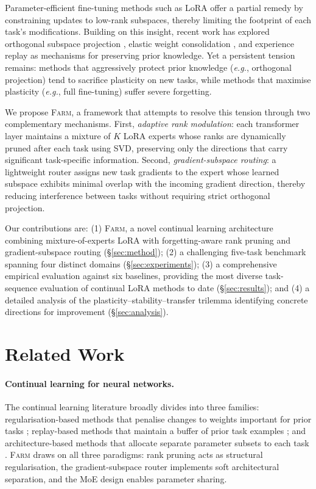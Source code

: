 \documentclass{article}
\newcommand{\FARM}{\textsc{Farm}}
\newcommand{\eg}{\textit{e.g.}}
\begin{document}
Parameter-efficient fine-tuning methods such as LoRA \citep{hu2022lora} offer a partial remedy by constraining updates to low-rank subspaces, thereby limiting the footprint of each task's modifications. Building on this insight, recent work has explored orthogonal subspace projection \citep{wang2023orthogonal}, elastic weight consolidation \citep{kirkpatrick2017overcoming}, and experience replay \citep{rolnick2019experience} as mechanisms for preserving prior knowledge. Yet a persistent tension remains: methods that aggressively protect prior knowledge (\eg, orthogonal projection) tend to sacrifice plasticity on new tasks, while methods that maximise plasticity (\eg, full fine-tuning) suffer severe forgetting.

We propose \FARM{}, a framework that attempts to resolve this tension through two complementary mechanisms. First, \emph{adaptive rank modulation}: each transformer layer maintains a mixture of $K$ LoRA experts whose ranks are dynamically pruned after each task using SVD, preserving only the directions that carry significant task-specific information. Second, \emph{gradient-subspace routing}: a lightweight router assigns new task gradients to the expert whose learned subspace exhibits minimal overlap with the incoming gradient direction, thereby reducing interference between tasks without requiring strict orthogonal projection.

Our contributions are: (1) \FARM{}, a novel continual learning architecture combining mixture-of-experts LoRA with forgetting-aware rank pruning and gradient-subspace routing (\S\ref{sec:method}); (2) a challenging five-task benchmark spanning four distinct domains (\S\ref{sec:experiments}); (3) a comprehensive empirical evaluation against six baselines, providing the most diverse task-sequence evaluation of continual LoRA methods to date (\S\ref{sec:results}); and (4) a detailed analysis of the plasticity–stability–transfer trilemma identifying concrete directions for improvement (\S\ref{sec:analysis}).

\section{Related Work}
\label{sec:related}

\paragraph{Continual learning for neural networks.}
The continual learning literature broadly divides into three families: regularisation-based methods that penalise changes to weights important for prior tasks \citep{kirkpatrick2017overcoming, zenke2017continual, aljundi2018memory}; replay-based methods that maintain a buffer of prior task examples \citep{rolnick2019experience, chaudhry2019tiny}; and architecture-based methods that allocate separate parameter subsets to each task \citep{rusu2016progressive, mallya2018packnet}. \FARM{} draws on all three paradigms: rank pruning acts as structural regularisation, the gradient-subspace router implements soft architectural separation, and the MoE design enables parameter sharing.
\end{document}
